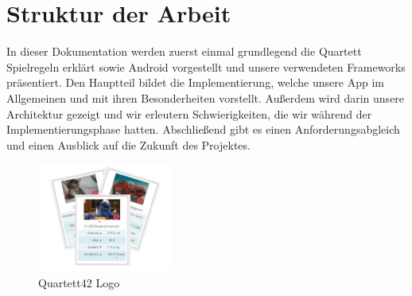 \section{Struktur der Arbeit}
\label{sec:einleitung:struktur}

In dieser Dokumentation werden zuerst einmal grundlegend die Quartett Spielregeln erklärt sowie Android vorgestellt und unsere verwendeten Frameworks präsentiert. Den Hauptteil bildet die Implementierung, welche unsere App im Allgemeinen und mit ihren Besonderheiten vorstellt. Außerdem wird darin unsere Architektur gezeigt und wir erleutern Schwierigkeiten, die wir während der Implementierungsphase hatten. Abschließend gibt es einen Anforderungsabgleich und einen Ausblick auf die Zukunft des Projektes.\\

\begin{figure}[htp]
	\centering
  	\includegraphics[width=0.4\textwidth]{img/quartett42_logo.png}
	\caption{Quartett42 Logo}
	\label{figure:quartett42logo}
\end{figure}
